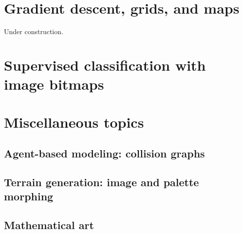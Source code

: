 \documentclass[oneside,10pt]{book}
\begin{document}
\section{Gradient descent, grids, and maps}

Under construction.




\section{Supervised classification with image bitmaps}

\section{Miscellaneous topics}\label{misc911}

\subsection{Agent-based modeling: collision graphs}\label{graph911}

\subsection{Terrain generation: image and palette morphing}

\subsection{Mathematical art}



\end{document}
